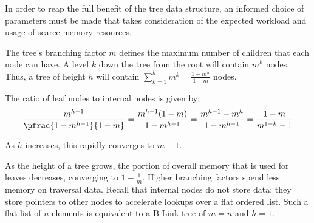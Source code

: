 

In order to reap the full benefit of the tree data structure, an informed choice
of parameters must be made that takes consideration of the expected workload and
usage of scarce memory resources.

The tree's branching factor $m$ defines the maximum number of children that each
node can have. A level $k$ down the tree from the root will contain $m^k$ nodes.
Thus, a tree of height $h$ will contain
$\sum_{k=1}^h m^k = \frac{1-m^h}{1-m}$ nodes.

The ratio of leaf nodes to internal nodes is given by:
$$
	\frac{m^{h-1}}{\pfrac{1-m^{h-1}}{1-m}}
	= \frac{m^{h-1}(1-m)}{1-m^{h-1}}
	= \frac{m^{h-1}-m^{h}}{1-m^{h-1}}
	= \frac{1-m}{m^{1-h} - 1}
$$

As $h$ increases, this rapidly converges to $m-1$.

\begin{figure}[H]
	\centering
\end{figure}

As the height of a tree grows, the portion of overall memory that is used for
leaves decreases, converging to $1-\frac{1}{m}$. Higher branching factors spend
less memory on traversal data. Recall that internal nodes do not store data;
they store pointers to other nodes to accelerate lookups over a flat ordered
list. Such a flat list of $n$ elements is equivalent to a B-Link tree of $m=n$
and $h=1$.

\begin{figure}[H]
	\centering
\end{figure}

